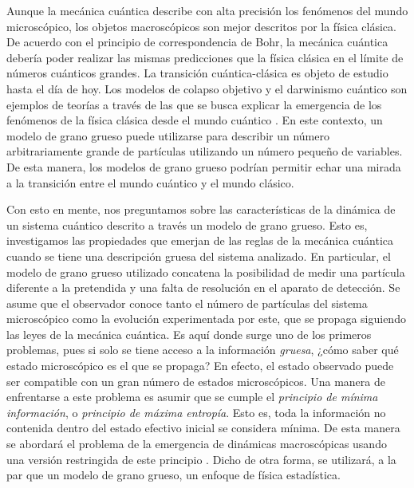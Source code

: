 Aunque la mecánica cuántica describe con alta precisión los fenómenos del mundo microscópico, los objetos macroscópicos son mejor descritos por la física clásica. De acuerdo con el principio de correspondencia de Bohr, la mecánica cuántica debería poder realizar las mismas predicciones que la física clásica en el límite de números cuánticos grandes. La transición cuántica-clásica es objeto de estudio hasta el día de hoy. Los modelos de colapso objetivo y el darwinismo cuántico son ejemplos de teorías a través de las que se busca explicar la emergencia de los fenómenos de la física clásica desde el mundo cuántico \cite{Zurek, Bassi}. En este contexto, un modelo de grano grueso puede utilizarse para describir un número arbitrariamente grande de partículas utilizando un número pequeño de variables. De esta manera, los modelos de grano grueso podrían permitir echar una mirada a la transición entre el mundo cuántico y el mundo clásico.



Con esto en mente, nos preguntamos sobre las características de la dinámica de un sistema cuántico descrito a través un modelo de grano grueso. Esto es, investigamos las propiedades que emerjan de las reglas de la mecánica cuántica cuando se tiene una descripción gruesa del sistema analizado. En particular, el modelo de grano grueso utilizado concatena la posibilidad de medir una partícula diferente a la pretendida y una falta de resolución en el aparato de detección. Se asume que el observador conoce tanto el número de partículas del sistema microscópico como la evolución experimentada por este, que se propaga siguiendo las leyes de la mecánica cuántica. Es aquí donde surge uno de los primeros problemas, pues si solo se tiene acceso a la información \textit{gruesa}, ¿cómo saber qué estado microscópico es el que se propaga? En efecto, el estado observado puede ser compatible con un gran número de estados microscópicos. Una manera de enfrentarse a este problema es asumir que se cumple el \textit{principio de mínima información}, o \textit{principio de máxima entropía}. Esto es, toda la información no contenida dentro del estado efectivo inicial se considera mínima. De esta manera se abordará el problema de la emergencia de dinámicas macroscópicas usando una versión restringida de este principio \cite{JaynesI,Brillouin}. Dicho de otra forma, se utilizará, a la par que un modelo de grano grueso, un enfoque de física estadística. %


